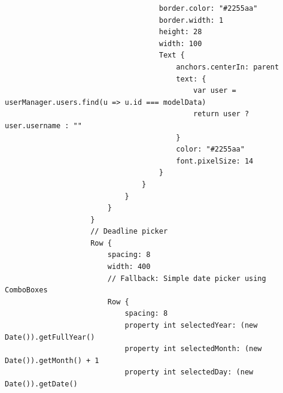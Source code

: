\documentclass{report}
\begin{document}
\begin{lstlisting}
                                    border.color: "#2255aa"
                                    border.width: 1
                                    height: 28
                                    width: 100
                                    Text {
                                        anchors.centerIn: parent
                                        text: {
                                            var user = userManager.users.find(u => u.id === modelData)
                                            return user ? user.username : ""
                                        }
                                        color: "#2255aa"
                                        font.pixelSize: 14
                                    }
                                }
                            }
                        }
                    }
                    // Deadline picker
                    Row {
                        spacing: 8
                        width: 400
                        // Fallback: Simple date picker using ComboBoxes
                        Row {
                            spacing: 8
                            property int selectedYear: (new Date()).getFullYear()
                            property int selectedMonth: (new Date()).getMonth() + 1
                            property int selectedDay: (new Date()).getDate()
    

\end{lstlisting}
\end{document}
